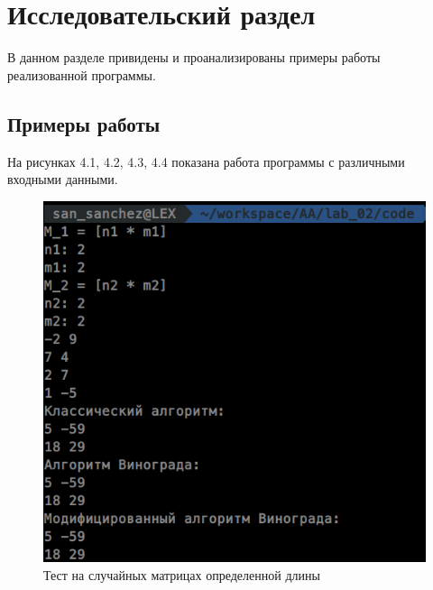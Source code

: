 \chapter{Исследовательский раздел}
\label{cha:research}

В данном разделе привидены и проанализированы примеры работы реализованной программы.

\section{Примеры работы}

На рисунках 4.1, 4.2, 4.3, 4.4 показана работа программы с различными входными данными.

\begin{figure}[H]
\centering
\includegraphics[scale=0.75]{./pict/wrk1.png}
\caption{Тест на случайных матрицах определенной длины}
\end{figure}
